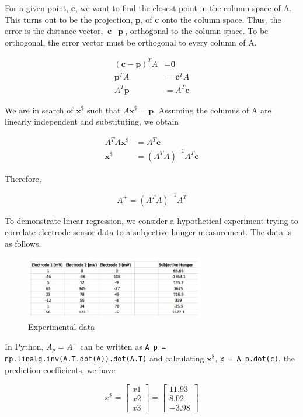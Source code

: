 \documentclass[11pt,a4paper]{article}
\begin{document}
For a given point, $\textbf{c}$, we want to find the closest point in the column space of A. This turns out to be the projection, $\textbf{p}$, of $\textbf{c}$ onto the column space. Thus, the error is the distance vector, $\textbf{c} - \textbf{p}$, orthogonal to the column space. To be orthogonal, the error vector must be orthogonal to every column of A.

\begin{align*}
(\textbf{c} - \textbf{p})^T A &= \textbf{0} \\
\textbf{p}^T A &= \textbf{c}^T A \\
A^T\textbf{p} &= A^T\textbf{c}
\end{align*}

We are in search of $\textbf{x}^\$$ such that $A\textbf{x}^\$ = \textbf{p}$. Assuming the columns of A are linearly independent and substituting, we obtain

\begin{align*}
A^T A\textbf{x}^\$ &= A^T\textbf{c} \\
\textbf{x}^\$ &= (A^T A)^{-1} A^T\textbf{c}
\end{align*}

Therefore,

\begin{equation} \label{eq:pseudo_inverse}
A^+ = (A^T A)^{-1} A^T
\end{equation}

\pagebreak

To demonstrate linear regression, we consider a hypothetical experiment trying to correlate electrode sensor data to a subjective hunger measurement. The data is as follows.

\begin{figure}[ht]
	\centering
	\includegraphics[width = 0.7\textwidth]{electrode}
	\caption{Experimental data}
	\label{fig:electrode}
\end{figure}

In Python, $A_p = A^+$ can be written as \verb|A_p = np.linalg.inv(A.T.dot(A)).dot(A.T)| and calculating $\textbf{x}^\$$, \verb|x = A_p.dot(c)|, the prediction coefficients, we have

\begin{equation}
	x^\$ =
	\begin{bmatrix}
		x1 \\
		x2 \\
		x3
	\end{bmatrix}
	=
	\begin{bmatrix}
		11.93 \\
		8.02 \\
		-3.98
	\end{bmatrix}
\end{equation}
\end{document}
